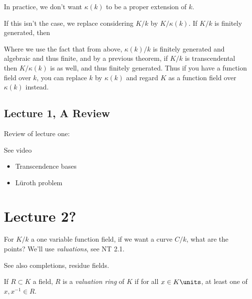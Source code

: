 In practice, we don't want \(\kappa(k)\) to be a proper extension of
\(k\).

If this isn't the case, we replace considering \(K/k\) by
\(K/\kappa(k)\). If \(K/k\) is finitely generated, then

\begin{center}
\end{center}

Where we use the fact that from above, \(\kappa(k)/k\) is finitely
generated and algebraic and thus finite, and by a previous theorem, if
\(K/k\) is transcendental then \(K/\kappa(k)\) is as well, and thus
finitely generated. Thus if you have a function field over \(k\), you
can replace \(k\) by \(\kappa(k)\) and regard \(K\) as a function field
over \(\kappa(k)\) instead.

\hypertarget{lecture-1-a-review}{%
\subsection{Lecture 1, A Review}\label{lecture-1-a-review}}

Review of lecture one:

\begin{theorem}

See video

\end{theorem}

\begin{itemize}
\tightlist
\item
  Transcendence bases
\item
  Lüroth problem
\end{itemize}

\hypertarget{lecture-2}{%
\section{Lecture 2?}\label{lecture-2}}

For \(K/k\) a one variable function field, if we want a curve \(C/k\),
what are the points? We'll use \emph{valuations}, see NT 2.1.

See also completions, residue fields.

If \(R \subset K\) a field, \(R\) is a \emph{valuation ring} of \(K\) if
for all \(x\in K\units\), at least one of \(x, x^{-1} \in R\).

